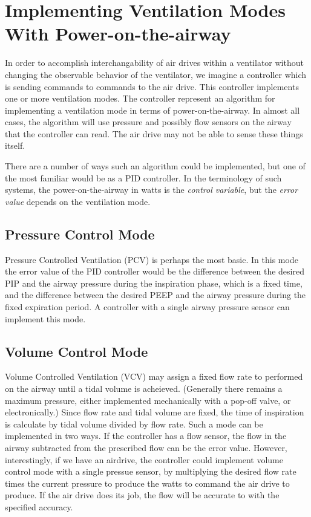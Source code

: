 \documentclass{article}
\begin{document}
\section{Implementing Ventilation Modes With Power-on-the-airway}

In order to accomplish interchangability of air drives within a ventilator without
changing the observable behavior of the ventilator, we imagine a controller which
is sending commands to commands to the air drive.
This controller implements one or more ventilation modes.
The controller represent an algorithm for implementing a ventilation mode
in terms of power-on-the-airway. In almost all cases, the algorithm will use
pressure and possibly flow sensors on the airway that the controller can read.
The air drive may not be able to sense these things itself.

There are a number of ways such an algorithm could be implemented, but
one of the most familiar would be as a PID controller. In the terminology
of such systems, the power-on-the-airway in watts is the {\em control variable},
but the {\em error value} depends on the ventilation mode.

\subsection{Pressure Control Mode}

Pressure Controlled Ventilation (PCV) is perhaps the most basic.
In this mode the error value of the PID controller would be the difference
between the desired PIP and the airway pressure during the inspiration phase,
which is a fixed time, and the difference between the desired PEEP and the
airway pressure during the fixed expiration period. A controller with a single
airway pressure sensor can implement this mode.

\subsection{Volume Control Mode}

Volume Controlled Ventilation (VCV) may assign a fixed flow rate to
performed on the airway until a tidal volume is acheieved.
(Generally there remains
a maximum pressure, either implemented mechanically with a pop-off valve,
or electronically.)
Since
flow rate and tidal volume are fixed, the time of inspiration
is calculate by tidal volume divided by flow rate.
Such a mode can be implemented in two ways. If the controller
has a flow sensor, the flow in the airway subtracted from the
prescribed flow can be the error value. However, interestingly, if
we have an airdrive, the controller could implement volume control mode with a single
pressue sensor, by multiplying the desired flow rate times the current pressure
to produce the watts to command the air drive to produce. If the air drive does its
job, the flow will be accurate to with the specified accuracy.
\end{document}
